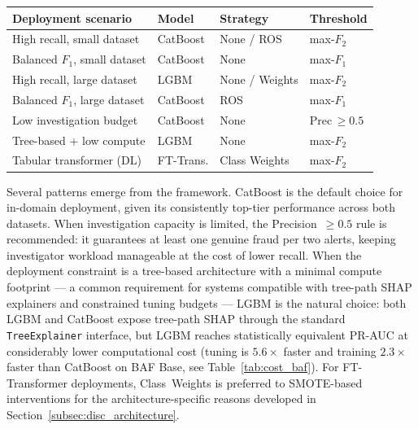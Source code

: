 \documentclass[a4paper,fleqn]{cas-sc}
\begin{document}
\par\medskip\noindent\begin{minipage}{\linewidth}\centering
{}
\label{tab:decision_framework}
\begin{tabular}{p{3.8cm} l l l}
\toprule
Deployment scenario & Model & Strategy & Threshold \\
\midrule
High recall, small dataset   & CatBoost  & None / ROS     & max-$F_2$      \\
Balanced $F_1$, small dataset & CatBoost  & None          & max-$F_1$      \\
High recall, large dataset   & LGBM      & None / Weights & max-$F_2$      \\
Balanced $F_1$, large dataset & CatBoost  & ROS           & max-$F_1$      \\
Low investigation budget     & CatBoost  & None           & Prec\,$\geq\!0.5$ \\
Tree-based + low compute     & LGBM      & None           & max-$F_2$      \\
Tabular transformer (DL)     & FT-Trans. & Class Weights  & max-$F_2$      \\
\bottomrule
\end{tabular}
\end{minipage}\par\medskip

Several patterns emerge from the framework. CatBoost is the default choice for
in-domain deployment, given its consistently top-tier performance across both datasets.
When investigation capacity is limited, the Precision~$\geq\!0.5$ rule is recommended:
it guarantees at least one genuine fraud per two alerts, keeping investigator workload
manageable at the cost of lower recall. When the deployment constraint is a tree-based
architecture with a minimal compute footprint --- a common requirement for systems
compatible with tree-path SHAP explainers and constrained tuning budgets --- LGBM is
the natural choice: both LGBM and CatBoost expose tree-path SHAP through the standard
\texttt{TreeExplainer} interface, but LGBM reaches statistically equivalent PR-AUC at
considerably lower computational cost (tuning is $5.6\times$ faster and training
$2.3\times$ faster than CatBoost on BAF Base, see Table~\ref{tab:cost_baf}). For
FT-Transformer deployments, Class~Weights is preferred to SMOTE-based interventions for
the architecture-specific reasons developed in
Section~\ref{subsec:disc_architecture}.
\end{document}
